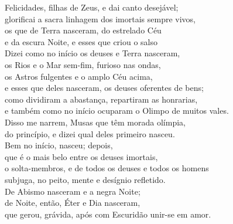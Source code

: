 \begin{pages}
\begin{Rightside}
\quad{}Felicidades, filhas de Zeus, e dai canto desejável;\\
glorificai a sacra linhagem dos imortais sempre vivos, \\
os que de Terra nasceram, do estrelado Céu\\
e da escura Noite, e esses que criou o salso \\
Dizei como no início os deuses e Terra nasceram,\\
os Rios e o Mar sem-fim, furioso nas ondas,\\
os Astros fulgentes e o amplo Céu acima, \\
e esses que deles nasceram, os deuses oferentes de bens;\\
como dividiram a abastança, repartiram as honrarias,\\
e também como no início ocuparam o Olimpo de muitos vales.\\
Disso me narrem, Musas que têm morada olímpia,\\
do princípio, e dizei qual deles primeiro nasceu. \\

\quad{}Bem no início,  nasceu; depois,\\
 que é o mais belo entre os deuses imortais,\\
o solta-membros, e de todos os deuses e todos os homens\\
subjuga, no peito, mente e desígnio refletido.\\[5pt]

De Abismo nasceram  e a negra Noite;\\
de Noite, então, Éter e Dia nasceram,\\
que gerou, grávida, após com Escuridão unir-se em amor.\\[5pt] 


\end{Rightside}
\end{pages}
